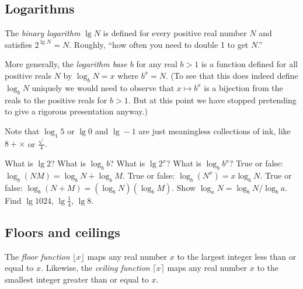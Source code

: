 \documentclass{tufte-handout}
\begin{document}
\subsection{Logarithms}

\begin{marginfigure}
\end{marginfigure}

The \emph{binary logarithm} $\lg N$ is defined for every positive real
number $N$ and satisfies $2^{\lg N} = N$. Roughly,
``how often you need to double 1 to get $N$.''

More generally, the \emph{logarithm base $b$} for any real $b>1$ is a
function defined for all positive reals $N$ by $\log_b N
= x$ where $b^x= N$.  (To see that this does indeed define $\log_b N$
uniquely we would need to observe that $x\mapsto b^x$ is a bijection
from the reals to the positive reals for $b> 1$. But at this point
we have stopped pretending to give a rigorous presentation anyway.)

Note that $\log_1 5$ or $\lg 0$ and $\lg -1$ are just meaningless collections of
ink, like $8+\times$ or $\frac{\sqrt{} }{4}$.

\begin{ExerciseList}
\Exercise What is $\lg 2$? What is $\log_b b$?
\Exercise What is $\lg 2^x$? What is $\log_b b^x$?
\Exercise True or false: $\log_b (NM)= \log_b N + \log_b M$.
\Exercise True or false: $\log_b (N^x)= x\log_b N.$
\Exercise True or false: $\log_b (N+M)= (\log_b N)( \log_b M)$.
\Exercise Show $\log_a N = \log_b N / \log_b a$.
\Exercise Find $\lg 1024$, $\lg \frac{1}{4}$, $\lg 8$.
\end{ExerciseList}


\subsection{Floors and ceilings}

The \emph{floor function} $\lfloor x\rfloor$ maps any real number $x$
to the largest integer less than or equal to $x$. Likewise, the
\emph{ceiling function} $\lceil x\rceil$ maps any real number $x$ to
the smallest integer greater than or equal to $x$.
\end{document}
